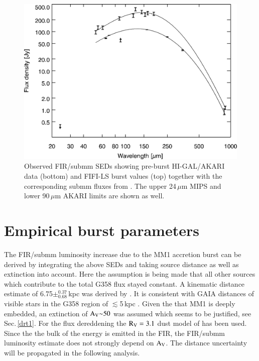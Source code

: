 \documentclass[longauth,usenatbib]{aa}
\begin{document}
\begin{figure}   %
	\includegraphics[width=\columnwidth]{G358_FIFI-LS_HI-GAL.png}
	\caption{Observed FIR/submm SEDs showing pre-burst HI-GAL/AKARI data (bottom) and FIFI-LS burst values (top) together with the corresponding submm fluxes from .
	The upper 24\,$\mu$m MIPS and lower 90\,$\mu$m AKARI limits are shown as well.
	}
 \label{fig:SEDS}
\end{figure}

\section{Empirical burst parameters}\label{ebp}
The FIR/submm luminosity increase due to the MM1 accretion burst can be derived by integrating the above SEDs and taking source distance as well as extinction into account. Here the assumption is being made that all other sources which contribute to the total G358 flux stayed constant.  A kinematic distance estimate of 6.75$\pm^{0.37}_{0.68}$\,kpc was derived by . It is consistent with GAIA distances of visible stars in the G358 region of $\lesssim$5\,kpc . 
 Given the that MM1 is deeply embedded, an extinction of $\rm A_V{\sim}50$ was assumed which seems to be justified, see Sec.\,\ref{drt1}. For the flux dereddening the $\rm R_V=3.1$ dust model of  has been used. Since the the bulk of the energy is emitted in the FIR, the FIR/submm luminosity estimate does not strongly depend on $\rm A_V$. The distance uncertainty will be propagated in the following analysis.
\end{document}
